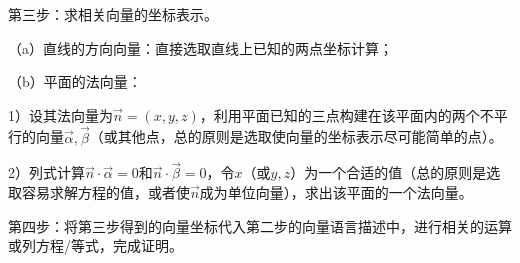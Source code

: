 第三步：求相关向量的坐标表示。

（a）直线的方向向量：直接选取直线上已知的两点坐标计算；

（b）平面的法向量：

1）设其法向量为\(\vec{n} = \left( x , y , z \right)\)，利用平面已知的三点构建在该平面内的两个不平行的向量\(\vec{\alpha} , \vec{\beta}\)（或其他点，总的原则是选取使向量的坐标表示尽可能简单的点）。

2）列式计算\(\vec{n} \cdot \vec{\alpha} = 0\)和\(\vec{n} \cdot \vec{\beta} = 0\)，令\(x\)（或\(y , z\)）为一个合适的值（总的原则是选取容易求解方程的值，或者使\(\vec{n}\)成为单位向量），求出该平面的一个法向量。

第四步：将第三步得到的向量坐标代入第二步的向量语言描述中，进行相关的运算或列方程/等式，完成证明。
\newpage
